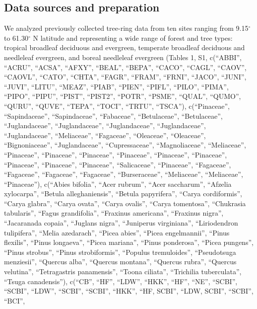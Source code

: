 \documentclass[
]{article}
\begin{document}
\hypertarget{data-sources-and-preparation}{%
\subsection{Data sources and
preparation}\label{data-sources-and-preparation}}

We analyzed previously collected tree-ring data from ten sites ranging
from 9.15\(^\circ\) to 61.30\(^\circ\) N latitude and representing a
wide range of forest and tree types: tropical broadleaf deciduous and
evergreen, temperate broadleaf deciduous and needleleaf evergreen, and
boreal needleleaf evergreen (Tables 1, S1, c(``ABBI'', ``ACRU'',
``ACSA'', ``AFXY'', ``BEAL'', ``BEPA'', ``CACO'', ``CAGL'', ``CAOV'',
``CAOVL'', ``CATO'', ``CHTA'', ``FAGR'', ``FRAM'', ``FRNI'', ``JACO'',
``JUNI'', ``JUVI'', ``LITU'', ``MEAZ'', ``PIAB'', ``PIEN'', ``PIFL'',
``PILO'', ``PIMA'', ``PIPO'', ``PIPU'', ``PIST'', ``PIST2'', ``POTR'',
``PSME'', ``QUAL'', ``QUMO'', ``QURU'', ``QUVE'', ``TEPA'', ``TOCI'',
``TRTU'', ``TSCA''), c(``Pinaceae'', ``Sapindaceae'', ``Sapindaceae'',
``Fabaceae'', ``Betulaceae'', ``Betulaceae'', ``Juglandaceae'',
``Juglandaceae'', ``Juglandaceae'', ``Juglandaceae'', ``Juglandaceae'',
``Meliaceae'', ``Fagaceae'', ``Oleaceae'', ``Oleaceae'',
``Bignoniaceae'', ``Juglandaceae'', ``Cupressaceae'', ``Magnoliaceae'',
``Meliaceae'', ``Pinaceae'', ``Pinaceae'', ``Pinaceae'', ``Pinaceae'',
``Pinaceae'', ``Pinaceae'', ``Pinaceae'', ``Pinaceae'', ``Pinaceae'',
``Salicaceae'', ``Pinaceae'', ``Fagaceae'', ``Fagaceae'', ``Fagaceae'',
``Fagaceae'', ``Burseraceae'', ``Meliaceae'', ``Meliaceae'',
``Pinaceae''), c(``Abies bifolia'', ``Acer rubrum'', ``Acer saccharum'',
``Afzelia xylocarpa'', ``Betula alleghaniensis'', ``Betula papyrifera'',
``Carya cordiformis'', ``Carya glabra'', ``Carya ovata'', ``Carya
ovalis'', ``Carya tomentosa'', ``Chukrasia tabularis'', ``Fagus
grandifolia'', ``Fraxinus americana'', ``Fraxinus nigra'', ``Jacaranada
copaia'', ``Juglans nigra'', ``Juniperus virginiana'', ``Liriodendron
tulipifera'', ``Melia azedarach'', ``Picea abies'', ``Picea
engelmannii'', ``Pinus flexilis'', ``Pinus longaeva'', ``Picea
mariana'', ``Pinus ponderosa'', ``Picea pungens'', ``Pinus strobus'',
``Pinus strobiformis'', ``Populus tremuloides'', ``Pseudotsuga
menziesii'', ``Quercus alba'', ``Quercus montana'', ``Quercus rubra'',
``Quercus velutina'', ``Tetragastris panamensis'', ``Toona ciliata'',
``Trichilia tuberculata'', ``Tsuga canadensis''), c(``CB'', ``HF'',
``LDW'', ``HKK'', ``HF'', ``NE'', ``SCBI'', ``SCBI'', ``LDW'', ``SCBI'',
``SCBI'', ``HKK'', ``HF, SCBI'', ``LDW, SCBI'', ``SCBI'', ``BCI'',
\end{document}
